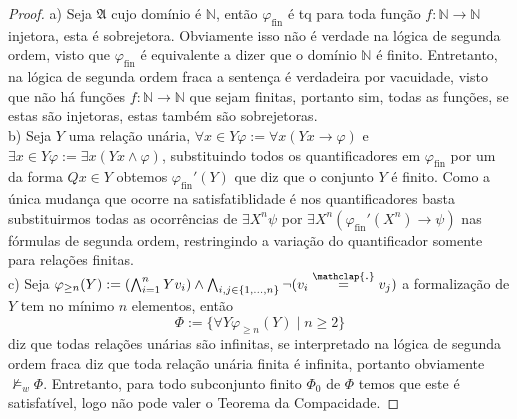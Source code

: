 \documentclass[11pt]{article}
\newcommand{\mf}[1]{\mathfrak{#1}}
\newcommand{\mbb}[1]{\mathbb{#1}}
\newcommand\overtext[2]{\stackrel{\mathclap{\normalfont\mbox{#1}}}{#2}}
\begin{document}
\begin{proof}
    a) Seja $\mf{A}$ cujo domínio é $\mbb{N}$, então $\varphi_\text{fin}$ é tq para toda função $f:\mbb{N}\to\mbb{N}$ injetora, esta é sobrejetora. Obviamente isso não é verdade na lógica de segunda ordem, visto que $\varphi_\text{fin}$ é equivalente a dizer que o domínio $\mbb{N}$ é finito. Entretanto, na lógica de segunda ordem fraca a sentença é verdadeira por vacuidade, visto que não há funções $f:\mbb{N}\to\mbb{N}$ que sejam finitas, portanto sim, todas as funções, se estas são injetoras, estas também são sobrejetoras.\\
    b) Seja $Y$ uma relação unária, $\forall x\in Y\varphi:=\forall x(Yx\rightarrow\varphi)$ e $\exists x\in Y\varphi:=\exists x(Yx\wedge\varphi)$, substituindo todos os quantificadores em $\varphi_\text{fin}$ por um da forma $Qx\in Y$ obtemos $\varphi_\text{fin}'(Y)$ que diz que o conjunto $Y$ é finito. Como a única mudança que ocorre na satisfatiblidade é nos quantificadores basta substituirmos todas as ocorrências de $\exists X^n\psi$ por $\exists X^n(\varphi_\text{fin}'(X^n)\rightarrow\psi)$ nas fórmulas de segunda ordem, restringindo a variação do quantificador somente para relações finitas.\\
    c) Seja $\varphi_{\ge n}(Y):=\left(\bigwedge_{i=1}^nYv_i\right)\wedge\bigwedge_{i,j\in\{1,\dots,n\}}\neg(v_i\overtext{.}{=}v_j)$ a formalização de $Y$ tem no mínimo $n$ elementos, então
    $$\Phi:=\{\forall Y\varphi_{\ge n}(Y)\mid n\ge 2\}$$
    diz que todas relações unárias são infinitas, se interpretado na lógica de segunda ordem fraca diz que toda relação unária finita é infinita, portanto obviamente $\nvDash_w\Phi$. Entretanto, para todo subconjunto finito $\Phi_0$ de $\Phi$ temos que este é satisfatível, logo não pode valer o Teorema da Compacidade.
    \end{proof}

\begin{comment}

\section{Computabilidade e suas Limitações}

\textbf{\color{red}{PENDENTE}}

\section{Modelos Livres e Programação Lógica}

\textbf{\color{red}{PENDENTE}}

\section{Uma Caracterização Algébrica da Equivalência Elementar}

\textbf{\color{red}{PENDENTE}}

\section{Teoremas de Lindström}

\textbf{\color{red}{PENDENTE}}

\end{comment}
\end{document}

